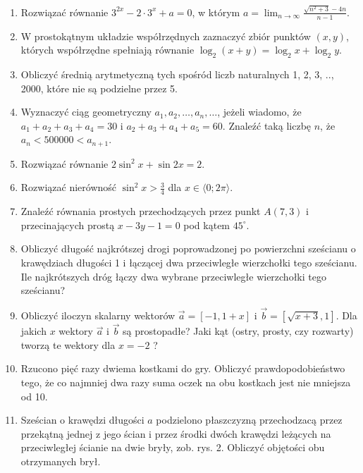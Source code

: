 \documentclass[10pt]{article}
\begin{document}
\begin{enumerate}
  \item Rozwiązać równanie \(3^{2 x}-2 \cdot 3^{x}+a=0\), w którym \(a=\lim _{n \rightarrow \infty} \frac{\sqrt{n^{2}+3}-4 n}{n-1}\).
  \item W prostokątnym układzie współrzędnych zaznaczyć zbiór punktów \((x, y)\), których współrzędne spełniają równanie \(\log _{2}(x+y)=\log _{2} x+\log _{2} y\).
  \item Obliczyć średnią arytmetyczną tych spośród liczb naturalnych 1, 2, 3, .., 2000, które nie są podzielne przez 5.
  \item Wyznaczyć ciąg geometryczny \(a_{1}, a_{2}, \ldots, a_{n}, \ldots\), jeżeli wiadomo, że \(a_{1}+a_{2}+a_{3}+a_{4}=30\) i \(a_{2}+a_{3}+a_{4}+a_{5}=60\). Znaleźć taką liczbę \(n\), że \(a_{n}<500000<a_{n+1}\).
  \item Rozwiązać równanie \(2 \sin ^{2} x+\sin 2 x=2\).
  \item Rozwiązać nierówność \(\sin ^{2} x>\frac{3}{4}\) dla \(x \in\langle 0 ; 2 \pi\rangle\).
  \item Znaleźć równania prostych przechodzących przez punkt \(A(7,3)\) i przecinających prostą \(x-3 y-1=0\) pod kątem \(45^{\circ}\).
  \item Obliczyć długość najkrótszej drogi poprowadzonej po powierzchni sześcianu o krawędziach długości 1 i łączącej dwa przeciwległe wierzchołki tego sześcianu. Ile najkrótszych dróg łączy dwa wybrane przeciwległe wierzchołki tego sześcianu?
  \item Obliczyć iloczyn skalarny wektorów \(\vec{a}=[-1,1+x]\) i \(\vec{b}=[\sqrt{x+3}, 1]\). Dla jakich \(x\) wektory \(\vec{a}\) i \(\vec{b}\) są prostopadłe? Jaki kąt (ostry, prosty, czy rozwarty) tworzą te wektory dla \(x=-2\) ?
  \item Rzucono pięć razy dwiema kostkami do gry. Obliczyć prawdopodobieństwo tego, że co najmniej dwa razy suma oczek na obu kostkach jest nie mniejsza od 10.
  \item Sześcian o krawędzi długości \(a\) podzielono płaszczyzną przechodzacą przez przekątną jednej z jego ścian i przez środki dwóch krawędzi leżących na przeciwległej ścianie na dwie bryły, zob. rys. 2. Obliczyć objętości obu otrzymanych brył.\\

\end{enumerate}
\end{document}
